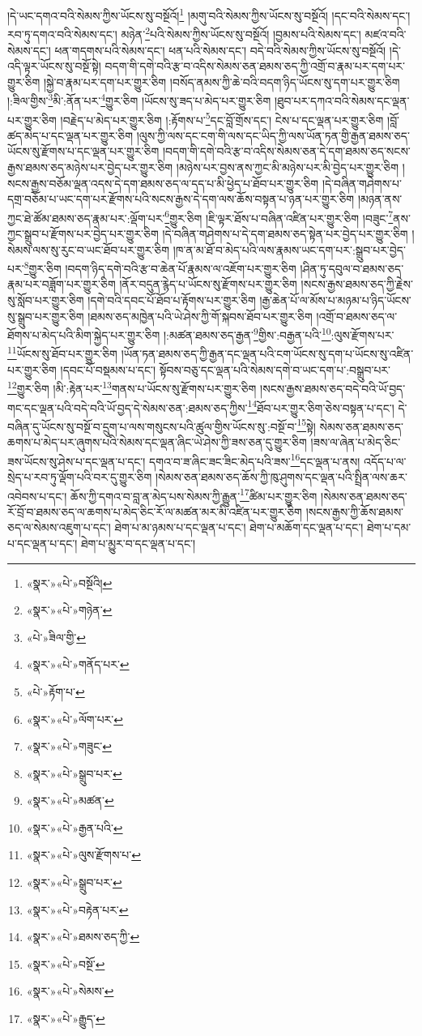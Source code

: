 །དེ་ཡང་དགའ་བའི་སེམས་ཀྱིས་ཡོངས་སུ་བསྔོའོ།\footnote{«སྣར་»«པེ་»བསྔོའི།} །མགུ་བའི་སེམས་ཀྱིས་ཡོངས་སུ་བསྔོའོ། །དང་བའི་སེམས་དང་། རབ་ཏུ་དགའ་བའི་སེམས་དང་། མཉེན་\footnote{«སྣར་»«པེ་»གཉེན་}པའི་སེམས་ཀྱིས་ཡོངས་སུ་བསྔོའོ། །བྱམས་པའི་སེམས་དང་། མཛའ་བའི་སེམས་དང་། ཕན་གདགས་པའི་སེམས་དང་། ཕན་པའི་སེམས་དང་། བདེ་བའི་སེམས་ཀྱིས་ཡོངས་སུ་བསྔོའོ། །དེ་འདི་ལྟར་ཡོངས་སུ་བསྔོ་སྟེ། བདག་གི་དགེ་བའི་རྩ་བ་འདིས་སེམས་ཅན་ཐམས་ཅད་ཀྱི་འགྲོ་བ་རྣམ་པར་དག་པར་གྱུར་ཅིག །སྐྱེ་བ་རྣམ་པར་དག་པར་གྱུར་ཅིག །བསོད་ནམས་ཀྱི་ཆེ་བའི་བདག་ཉིད་ཡོངས་སུ་དག་པར་གྱུར་ཅིག །:ཟིལ་གྱིས་\footnote{«པེ་»ཟིལ་གྱི་}མི་:ནོན་པར་\footnote{«སྣར་»«པེ་»གནོད་པར་}གྱུར་ཅིག །ཡོངས་སུ་ཟད་པ་མེད་པར་གྱུར་ཅིག །ཐུབ་པར་དཀའ་བའི་སེམས་དང་ལྡན་པར་གྱུར་ཅིག །བརྗེད་པ་མེད་པར་གྱུར་ཅིག །:རྟོགས་པ་\footnote{«པེ་»རྟོག་པ་}དང་བློ་གྲོས་དང་། ངེས་པ་དང་ལྡན་པར་གྱུར་ཅིག །བློ་ཚད་མེད་པ་དང་ལྡན་པར་གྱུར་ཅིག །ལུས་ཀྱི་ལས་དང་ངག་གི་ལས་དང་ཡིད་ཀྱི་ལས་ཡོན་ཏན་གྱི་རྒྱན་ཐམས་ཅད་ཡོངས་སུ་རྫོགས་པ་དང་ལྡན་པར་གྱུར་ཅིག །བདག་གི་དགེ་བའི་རྩ་བ་འདིས་སེམས་ཅན་དེ་དག་ཐམས་ཅད་སངས་རྒྱས་ཐམས་ཅད་མཉེས་པར་བྱེད་པར་གྱུར་ཅིག །མཉེས་པར་བྱས་ནས་ཀྱང་མི་མཉེས་པར་མི་བྱེད་པར་གྱུར་ཅིག །སངས་རྒྱས་བཅོམ་ལྡན་འདས་དེ་དག་ཐམས་ཅད་ལ་དད་པ་མི་ཕྱེད་པ་ཐོབ་པར་གྱུར་ཅིག །དེ་བཞིན་གཤེགས་པ་དགྲ་བཅོམ་པ་ཡང་དག་པར་རྫོགས་པའི་སངས་རྒྱས་དེ་དག་ལས་ཆོས་བསྟན་པ་ཉན་པར་གྱུར་ཅིག །མཉན་ནས་ཀྱང་ཐེ་ཚོམ་ཐམས་ཅད་རྣམ་པར་:ལྡོག་པར་\footnote{«སྣར་»«པེ་»ལོག་པར་}གྱུར་ཅིག །ཇི་ལྟར་ཐོས་པ་བཞིན་འཛིན་པར་གྱུར་ཅིག །བཟུང་\footnote{«སྣར་»«པེ་»གཟུང་}ནས་ཀྱང་སྒྲུབ་པ་རྫོགས་པར་བྱེད་པར་གྱུར་ཅིག །དེ་བཞིན་གཤེགས་པ་དེ་དག་ཐམས་ཅད་སྟེན་པར་བྱེད་པར་གྱུར་ཅིག །སེམས་ལས་སུ་རུང་བ་ཡང་ཐོབ་པར་གྱུར་ཅིག །ཁ་ན་མ་ཐོ་བ་མེད་པའི་ལས་རྣམས་ཡང་དག་པར་:སྒྲུབ་པར་བྱེད་པར་\footnote{«སྣར་»«པེ་»སྒྲུབ་པར་}གྱུར་ཅིག །བདག་ཉིད་དགེ་བའི་རྩ་བ་ཆེན་པོ་རྣམས་ལ་འཇོག་པར་གྱུར་ཅིག །ཤིན་ཏུ་དབུལ་བ་ཐམས་ཅད་རྣམ་པར་བཟློག་པར་གྱུར་ཅིག །ནོར་བདུན་རྙེད་པ་ཡོངས་སུ་རྫོགས་པར་གྱུར་ཅིག །སངས་རྒྱས་ཐམས་ཅད་ཀྱི་རྗེས་སུ་སློབ་པར་གྱུར་ཅིག །དགེ་བའི་དབང་པོ་ཐོབ་པ་རྟོགས་པར་གྱུར་ཅིག །རྒྱ་ཆེན་པོ་ལ་མོས་པ་མཉམ་པ་ཉིད་ཡོངས་སུ་སྒྲུབ་པར་གྱུར་ཅིག །ཐམས་ཅད་མཁྱེན་པའི་ཡེ་ཤེས་ཀྱི་གོ་སྐབས་ཐོབ་པར་གྱུར་ཅིག །འགྲོ་བ་ཐམས་ཅད་ལ་ཐོགས་པ་མེད་པའི་མིག་སྐྱེད་པར་གྱུར་ཅིག །:མཚན་ཐམས་ཅད་རྒྱན་\footnote{«སྣར་»«པེ་»མཚན་}གྱིས་:བརྒྱན་པའི་\footnote{«སྣར་»«པེ་»རྒྱན་པའི་}:ལུས་རྫོགས་པར་\footnote{«སྣར་»«པེ་»ལུས་རྫོགས་པ་}ཡོངས་སུ་ཐོབ་པར་གྱུར་ཅིག །ཡོན་ཏན་ཐམས་ཅད་ཀྱི་རྒྱན་དང་ལྡན་པའི་ངག་ཡོངས་སུ་དག་པ་ཡོངས་སུ་འཛིན་པར་གྱུར་ཅིག །དབང་པོ་བསྡམས་པ་དང་། སྟོབས་བཅུ་དང་ལྡན་པའི་སེམས་དགེ་བ་ཡང་དག་པ་:བསྒྲུབ་པར་\footnote{«སྣར་»«པེ་»སྒྲུབ་པར་}གྱུར་ཅིག །མི་:རྟེན་པར་\footnote{«སྣར་»«པེ་»བརྟེན་པར་}གནས་པ་ཡོངས་སུ་རྫོགས་པར་གྱུར་ཅིག །སངས་རྒྱས་ཐམས་ཅད་བདེ་བའི་ཡོ་བྱད་གང་དང་ལྡན་པའི་བདེ་བའི་ཡོ་བྱད་དེ་སེམས་ཅན་:ཐམས་ཅད་ཀྱིས་\footnote{«སྣར་»«པེ་»ཐམས་ཅད་ཀྱི་}ཐོབ་པར་གྱུར་ཅིག་ཅེས་བསྟན་པ་དང་། དེ་བཞིན་དུ་ཡོངས་སུ་བསྔོ་བ་དྲུག་པ་ལས་གསུངས་པའི་ཚུལ་གྱིས་ཡོངས་སུ་:བསྔོ་བ་\footnote{«སྣར་»«པེ་»བསྔོ་}སྟེ། སེམས་ཅན་ཐམས་ཅད་ཆགས་པ་མེད་པར་ཞུགས་པའི་སེམས་དང་ལྡན་ཞིང་ཡེ་ཤེས་ཀྱི་ཟས་ཅན་དུ་གྱུར་ཅིག །ཟས་ལ་ཞེན་པ་མེད་ཅིང་ཟས་ཡོངས་སུ་ཤེས་པ་དང་ལྡན་པ་དང་། དགའ་བ་ཟ་ཞིང་ཟང་ཟིང་མེད་པའི་ཟས་\footnote{«སྣར་»«པེ་»སེམས་}དང་ལྡན་པ་ནས། འདོད་པ་ལ་སྲེད་པ་རབ་ཏུ་ལྡོག་པའི་བར་དུ་གྱུར་ཅིག །སེམས་ཅན་ཐམས་ཅད་ཆོས་ཀྱི་ཁུ་ཤུགས་དང་ལྡན་པའི་སྤྲིན་ལས་ཆར་འབེབས་པ་དང་། ཆོས་ཀྱི་དགའ་བ་བླ་ན་མེད་པས་སེམས་ཀྱི་རྒྱུན་\footnote{«སྣར་»«པེ་»རྒྱུད་}ཚིམ་པར་གྱུར་ཅིག །སེམས་ཅན་ཐམས་ཅད་རོ་བྲོ་བ་ཐམས་ཅད་ལ་ཆགས་པ་མེད་ཅིང་རོ་ལ་མཚན་མར་མི་འཛིན་པར་གྱུར་ཅིག །སངས་རྒྱས་ཀྱི་ཆོས་ཐམས་ཅད་ལ་སེམས་འཇུག་པ་དང་། ཐེག་པ་མ་ཉམས་པ་དང་ལྡན་པ་དང་། ཐེག་པ་མཆོག་དང་ལྡན་པ་དང་། ཐེག་པ་དམ་པ་དང་ལྡན་པ་དང་། ཐེག་པ་མྱུར་བ་དང་ལྡན་པ་དང་། 
